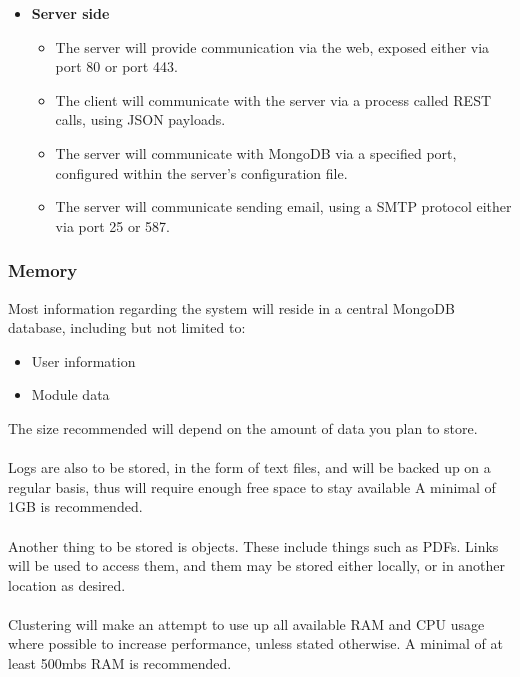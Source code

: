 \documentclass[a4paper,12pt]{article}
\begin{document}
            \begin{itemize}
            	\item \textbf{Server side}
            	\begin{itemize}
           			\item The server will provide communication via the web, exposed either via port 80 or port 443.
	            	\item The client will communicate with the server via a process called REST calls, using JSON payloads.
	            	\item The server will communicate with MongoDB via a specified port, configured within the server's configuration file.
	            	\item The server will communicate sending email, using a SMTP protocol either via port 25 or 587.
            	\end{itemize}
            \end{itemize}
            
            \subsubsection{Memory}
            
            Most information regarding the system will reside in a central
            MongoDB database, including but not limited to:
            
            \begin{itemize}
            	\item User information
            	\item Module data
            \end{itemize}
        	The size recommended will depend on the amount of data you plan to store.\\\\
           	Logs are also to be stored, in the form of text files, and will be backed up on a regular basis, thus will require enough free space to stay available A minimal of 1GB is recommended.\\\\	
           	Another thing to be stored is objects. These include things such as PDFs. Links will be used to access them, and them may be stored either locally, or in another location as desired.\\\\
           	Clustering will make an attempt to use up all available RAM and CPU usage where possible to increase performance, unless stated otherwise. A minimal of at least 500mbs RAM is recommended.
            
\end{document}
